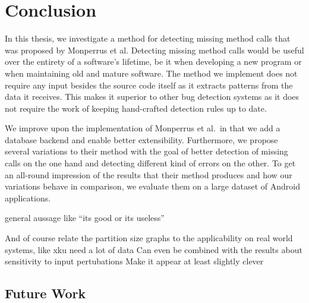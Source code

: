 \chapter{Conclusion}\label{ch:concl}

In this thesis, we investigate a method for detecting missing method calls that was proposed by Monperrus et al.
Detecting missing method calls would be useful over the entirety of a software's lifetime, be it when developing a new program or when maintaining old and mature software.
The method we implement does not require any input besides the source code itself as it extracts patterns from the data it receives.
This makes it superior to other bug detection systems as it does not require the work of keeping hand-crafted detection rules up to date.

We improve upon the implementation of Monperrus et al.\ in that we add a database backend and enable better extensibility.
Furthermore, we propose several variations to their method with the goal of better detection of missing calls on the one hand and detecting different kind of errors on the other.
To get an all-round impression of the results that their method produces and how our variations behave in comparison, we evaluate them on a large dataset of Android applications. 

general aussage like ``its good or its useless''

	And of course relate the partition size graphs to the applicability on real world systems, like xku need a lot of data
	Can even be combined with the results about sensitivity to input pertubations
	Make it appear at least slightly clever


\section{Future Work}

